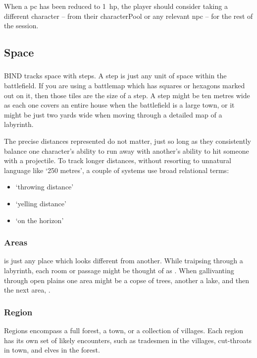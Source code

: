 \begin{multicols}{2}
When a \gls{pc} has been reduced to 1~\gls{hp}, the player should consider taking a different character -- from their \gls{characterPool} or any relevant \gls{npc} -- for the rest of the session.

\subsection{Space}
\label{space}

\subsubsection{}

BIND tracks space with \glspl{step}.
A \gls{step} is just any unit of space within the battlefield.
If you are using a battlemap which has squares or hexagons marked out on it, then those tiles are the size of a step.
A step might be ten metres wide as each one covers an entire house when the battlefield is a large town, or it might be just two yards wide when moving through a detailed map of a labyrinth.

The precise distances represented do not matter, just so long as they consistently balance one character's ability to run away with another's ability to hit someone with a projectile.
To track longer distances, without resorting to unnatural language like `250 metres', a couple of systems use broad relational terms:

\begin{itemize}
  \item
  `throwing distance'
  \item
  `yelling distance'
  \item
  `on the horizon'
\end{itemize}

\subsubsection{Areas}

 is just any place which looks different from another.
While traipsing through a labyrinth, each room or passage might be thought of as .
When gallivanting through open plains one \gls{area} might be a copse of trees, another a lake, and then the next area, .

\subsubsection{Region}

Regions encompass a full forest, a town, or a collection of \glspl{village}.
Each region has its own set of likely encounters, such as tradesmen in the \glspl{village}, cut-throats in town, and elves in the forest.

\end{multicols}

